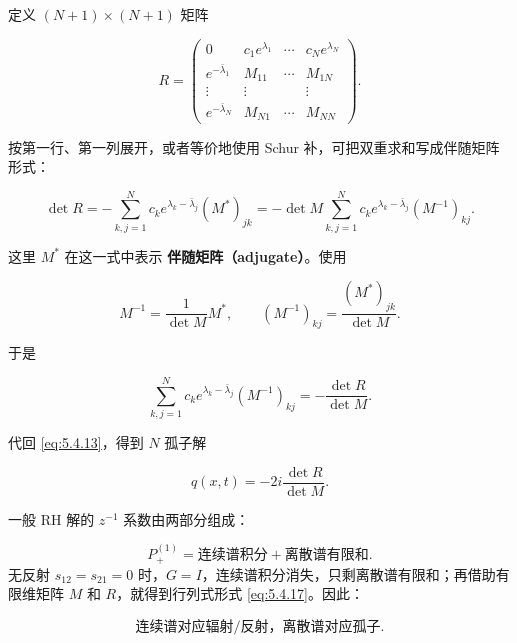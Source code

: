 \documentclass[
    lang=cn,
    scheme=chinese,
    mode=simple,
    device=normal,
    color=blue,
    math=cm,
    thmcnt=section,
    12pt
]{elegantbook}
\begin{document}
定义 $(N+1)\times(N+1)$ 矩阵

\begin{equation}
    R=
    \begin{pmatrix}
        0                  & c_1e^{\lambda_1} & \cdots & c_Ne^{\lambda_N} \\
        e^{-\bar\lambda_1} & M_{11}           & \cdots & M_{1N}           \\
        \vdots             & \vdots           &        & \vdots           \\
        e^{-\bar\lambda_N} & M_{N1}           & \cdots & M_{NN}
    \end{pmatrix}.
    \tag{5.4.14}
    \label{eq:5.4.14}
\end{equation}

按第一行、第一列展开，或者等价地使用 Schur 补，可把双重求和写成伴随矩阵形式：

\begin{equation}
    \det R
    =
    -\sum\limits_{k,j=1}^{N}
    c_ke^{\lambda_k-\bar\lambda_j}(M^*)_{jk}
    =
    -\det M
    \sum\limits_{k,j=1}^{N}
    c_ke^{\lambda_k-\bar\lambda_j}(M^{-1})_{kj}.
    \tag{5.4.15}
    \label{eq:5.4.15}
\end{equation}

这里 $M^*$ 在这一式中表示 \textbf{伴随矩阵（adjugate）}。使用

\[
    M^{-1}
    =
    \dfrac{1}{\det M}M^*,
    \qquad
    (M^{-1})_{kj}
    =
    \dfrac{(M^*)_{jk}}{\det M}.
\]

于是

\begin{equation}
    \sum\limits_{k,j=1}^{N}
    c_ke^{\lambda_k-\bar\lambda_j}(M^{-1})_{kj}
    =
    -\dfrac{\det R}{\det M}.
    \tag{5.4.16}
    \label{eq:5.4.16}
\end{equation}

代回 \eqref{eq:5.4.13}，得到 $N$ 孤子解

\begin{equation}
    \boxed{
        q(x,t)
        =
        -2i\dfrac{\det R}{\det M}.
    }
    \tag{5.4.17}
    \label{eq:5.4.17}
\end{equation}

\begin{callout}[4.2 节的核心思路]
    一般 RH 解的 $z^{-1}$ 系数由两部分组成：

    \[
        P_+^{(1)}
        =
        \text{连续谱积分}
        +
        \text{离散谱有限和}.
    \]
    无反射 $s_{12}=s_{21}=0$ 时，$G=I$，连续谱积分消失，只剩离散谱有限和；再借助有限维矩阵 $M$ 和 $R$，就得到行列式形式 \eqref{eq:5.4.17}。因此：

    \[
        \boxed{\text{连续谱对应辐射/反射，离散谱对应孤子}.}
    \]

\end{callout}
\end{document}
